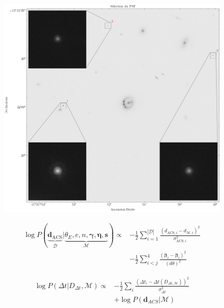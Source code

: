 \documentclass[times,10pt,twocolumn]{article}
\begin{document}
\begin{figure}[H]
        \centering
        \includegraphics[width=\linewidth]{psf_cutout}
        \caption{}
        \label{fig:psf}
\end{figure}



\begin{align}
        \nonumber
        \log P(\underbrace{\mathbf{d}_{\mathrm{ACS}}}_{\mathcal{D}}
        | \underbrace{\theta_E, e, n, \boldsymbol{\gamma}, \mathbf{\eta}, \mathbf{s}}_{\mathcal{M}}) \propto  
        &-\frac{1}{2}\sum_{i=1}^{|\mathcal{D}|} \frac{(d_{\mathrm{ACS},i} - d_{\mathcal{M}, i})^{2}}
        {\sigma_{\mathrm{ACS},i}^2}
        \\
\label{eq:Inference} 
        &-\frac{1}{2}\sum_{i < j}^{4} \frac{(\boldsymbol{\beta}_{i} - \boldsymbol{\beta}_i)^{2}}{(d\theta)^{2}}
\end{align} 

\begin{align}
\nonumber
        \log P(\Delta t | D_{\Delta t}, \mathcal{M}) \propto 
        &-\frac{1}{2} \sum_i \frac{(\Delta t_i - \Delta t(D_{\Delta t, \mathcal{M}}))^{2}}{\sigma_{\Delta t}^{2}}
        \\\label{eq:JointLikelihood}
        &+\log P(\mathbf{d}_{ACS} | \mathcal{M})
\end{align}
\end{document}
